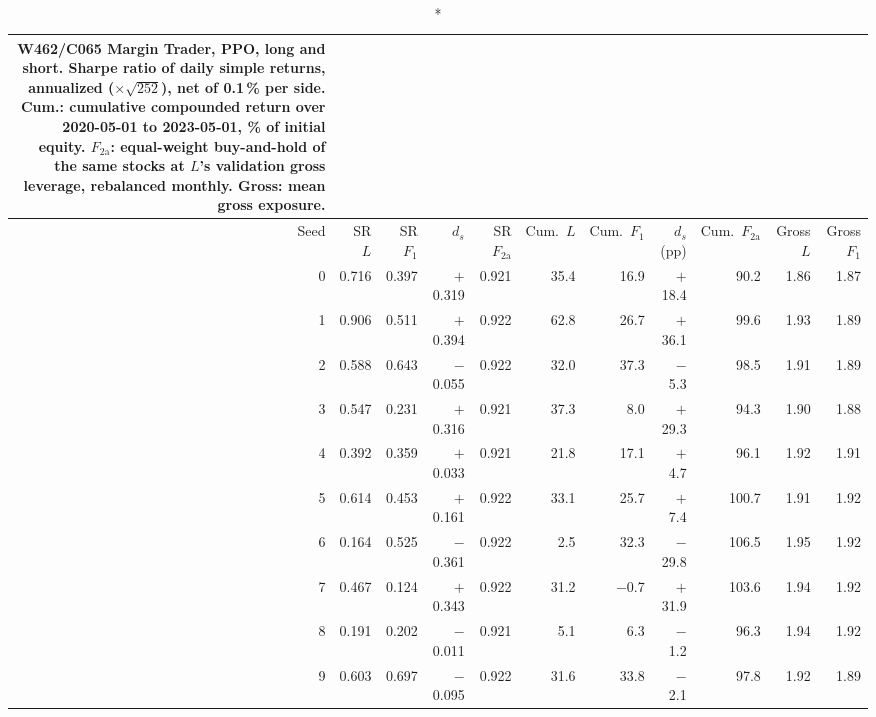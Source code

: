 \begin{longtable}{@{}rrrrrrrrrrr@{}}
\caption*{\small W462/C065 Margin Trader, PPO, long and short. Sharpe ratio of daily simple returns, annualized ($\times\sqrt{252}$), net of 0.1\,\% per side. Cum.: cumulative compounded return over 2020-05-01 to 2023-05-01, \% of initial equity. $F_{2\mathrm{a}}$: equal-weight buy-and-hold of the same stocks at $L$'s validation gross leverage, rebalanced monthly. Gross: mean gross exposure.}\\
\toprule
Seed & SR $L$ & SR $F_1$ & $d_s$ & SR $F_{2\mathrm{a}}$ & Cum.\ $L$ & Cum.\ $F_1$ & $d_s$ (pp) & Cum.\ $F_{2\mathrm{a}}$ & Gross $L$ & Gross $F_1$\\ \midrule\endhead
0 & 0.716 & 0.397 & $+$0.319 & 0.921 & 35.4 & 16.9 & $+$18.4 & 90.2 & 1.86 & 1.87\\
1 & 0.906 & 0.511 & $+$0.394 & 0.922 & 62.8 & 26.7 & $+$36.1 & 99.6 & 1.93 & 1.89\\
2 & 0.588 & 0.643 & $-$0.055 & 0.922 & 32.0 & 37.3 & $-$5.3 & 98.5 & 1.91 & 1.89\\
3 & 0.547 & 0.231 & $+$0.316 & 0.921 & 37.3 & 8.0 & $+$29.3 & 94.3 & 1.90 & 1.88\\
4 & 0.392 & 0.359 & $+$0.033 & 0.921 & 21.8 & 17.1 & $+$4.7 & 96.1 & 1.92 & 1.91\\
5 & 0.614 & 0.453 & $+$0.161 & 0.922 & 33.1 & 25.7 & $+$7.4 & 100.7 & 1.91 & 1.92\\
6 & 0.164 & 0.525 & $-$0.361 & 0.922 & 2.5 & 32.3 & $-$29.8 & 106.5 & 1.95 & 1.92\\
7 & 0.467 & 0.124 & $+$0.343 & 0.922 & 31.2 & $-$0.7 & $+$31.9 & 103.6 & 1.94 & 1.92\\
8 & 0.191 & 0.202 & $-$0.011 & 0.921 & 5.1 & 6.3 & $-$1.2 & 96.3 & 1.94 & 1.92\\
9 & 0.603 & 0.697 & $-$0.095 & 0.922 & 31.6 & 33.8 & $-$2.1 & 97.8 & 1.92 & 1.89\\
\bottomrule\end{longtable}
